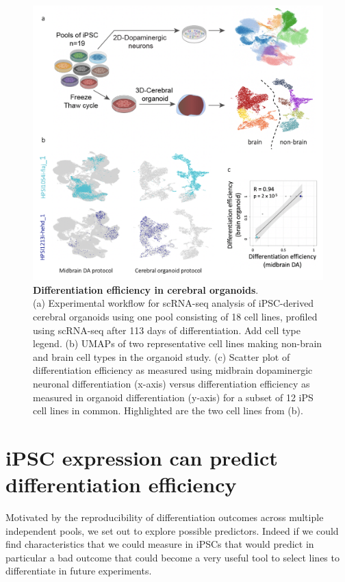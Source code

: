 \begin{figure}[htbp]
\centering
\includegraphics[width=14cm]{Chapter5/Fig/neuroseq_organoids.png}
\caption[Differentiation efficiency in cerebral organoids]{\textbf{Differentiation efficiency in cerebral organoids}.\\
(a) Experimental workflow for scRNA-seq analysis of iPSC-derived cerebral organoids using one pool consisting of 18 cell lines, profiled using scRNA-seq after 113 days of differentiation.
Add cell type legend. 
(b) UMAPs of two representative cell lines making non-brain and brain cell types in the organoid study. 
(c) Scatter plot of differentiation efficiency as measured using midbrain dopaminergic neuronal differentiation (x-axis) versus differentiation efficiency as measured in organoid differentiation (y-axis) for a subset of 12 iPS cell lines in common. 
Highlighted are the two cell lines from (b).}
\label{fig:neuroseq_organoids}
\end{figure}

\newpage

\section{iPSC expression can predict differentiation efficiency}

Motivated by the reproducibility of differentiation outcomes across multiple independent pools, we set out to explore possible predictors.
Indeed if we could find characteristics that we could measure in iPSCs that would predict in particular a bad outcome that could become a very useful tool to select lines to differentiate in future experiments.\\

